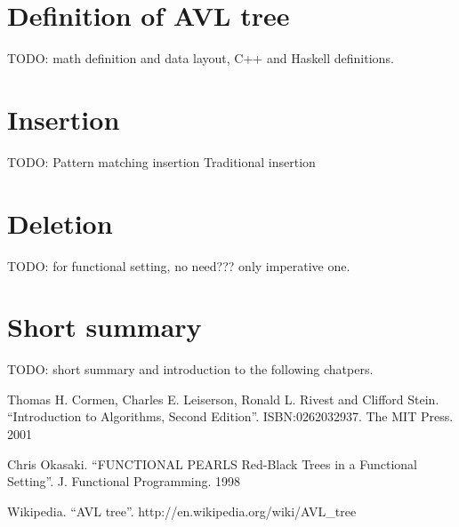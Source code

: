\documentclass{article}
\begin{document}
\section{Definition of AVL tree}

TODO: math definition and data layout, 
C++ and Haskell definitions.

\section{Insertion}

TODO:
  Pattern matching insertion
  Traditional insertion
 

\section{Deletion}

  TODO: for functional setting, no need??? only imperative one.


\section{Short summary}
  TODO: short summary and introduction to the following chatpers.

\begin{thebibliography}{99}

Thomas H. Cormen, Charles E. Leiserson, Ronald L. Rivest and Clifford Stein. 
``Introduction to Algorithms, Second Edition''. ISBN:0262032937. The MIT Press. 2001

Chris Okasaki. ``FUNCTIONAL PEARLS Red-Black Trees in a Functional Setting''. J. Functional Programming. 1998

Wikipedia. ``AVL tree''. http://en.wikipedia.org/wiki/AVL\_tree

\end{thebibliography}

\ifx\wholebook\relax\else
\end{document}
